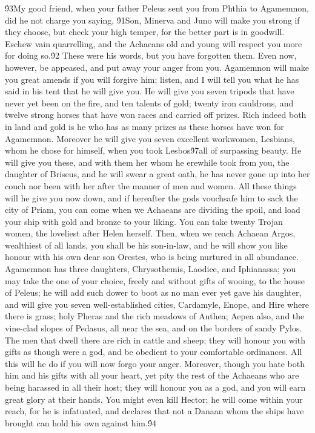 {\'93My good friend, when your father Peleus sent you from Phthia to Agamemnon, did he not charge you saying, \'91Son, Minerva and Juno will make you strong if they choose, but check your high temper, for the better part is in goodwill. Eschew vain quarrelling, and the Achaeans old and young will respect you more for doing so.\'92 These were his words, but you have forgotten them. Even now, however, be appeased, and put away your anger from you. Agamemnon will make you great amends if you will forgive him; listen, and I will tell you what he has said in his tent that he will give you. He will give you seven tripods that have never yet been on the fire, and ten talents of gold; twenty iron cauldrons, and twelve strong horses that have won races and carried off prizes. Rich indeed both in land and gold is he who has as many prizes as these horses have won for Agamemnon. Moreover he will give you seven excellent workwomen, Lesbians, whom he chose for himself, when you took Lesbos\'97all of surpassing beauty. He will give you these, and with them her whom he erewhile took from you, the daughter of Briseus, and he will swear a great oath, he has never gone up into her couch nor been with her after the manner of men and women. All these things will he give you now down, and if hereafter the gods vouchsafe him to sack the city of Priam, you can come when we Achaeans are dividing the spoil, and load your ship with gold and bronze to your liking. You can take twenty Trojan women, the loveliest after Helen herself. Then, when we reach Achaean Argos, wealthiest of all lands, you shall be his son-in-law, and he will show you like honour with his own dear son Orestes, who is being nurtured in all abundance. Agamemnon has three daughters, Chrysothemis, Laodice, and Iphianassa; you may take the one of your choice, freely and without gifts of wooing, to the house of Peleus; he will add such dower to boot as no man ever yet gave his daughter, and will give you seven well-established cities, Cardamyle, Enope, and Hire where there is grass; holy Pheras and the rich meadows of Anthea; Aepea also, and the vine-clad slopes of Pedasus, all near the sea, and on the borders of sandy Pylos. The men that dwell there are rich in cattle and sheep; they will honour you with gifts as though were a god, and be obedient to your comfortable ordinances. All this will he do if you will now forgo your anger. Moreover, though you hate both him and his gifts with all your heart, yet pity the rest of the Achaeans who are being harassed in all their host; they will honour you as a god, and you will earn great glory at their hands. You might even kill Hector; he will come within your reach, for he is infatuated, and declares that not a Danaan whom the ships have brought can hold his own against him.\'94\
}
